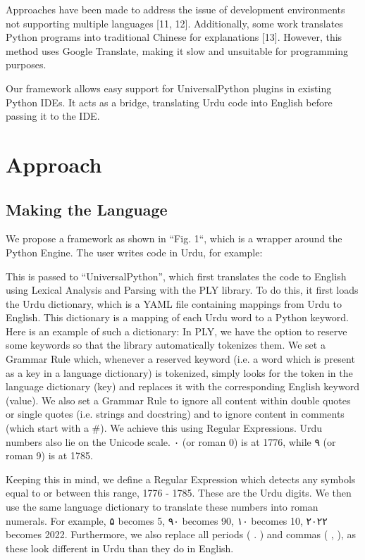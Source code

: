 \documentclass[conference]{IEEEtran}
\begin{document}
Approaches have been made to address the issue of development environments not supporting multiple languages [11, 12]. Additionally, some work translates Python programs into traditional Chinese for explanations [13]. However, this method uses Google Translate, making it slow and unsuitable for programming purposes.

Our framework allows easy support for UniversalPython plugins in existing Python IDEs. It acts as a bridge, translating Urdu code into English before passing it to the IDE.

\section{Approach}

\subsection{Making the Language}

We propose a framework as shown in “Fig. 1“, which is a wrapper around the Python Engine. The user writes code in Urdu, for example:

This is passed to “UniversalPython”, which first translates the code to English using Lexical Analysis and Parsing with the PLY library.
To do this, it first loads the Urdu dictionary, which is a YAML file containing mappings from Urdu to English. This dictionary is a mapping of each Urdu word to a Python keyword. Here is an example of such a dictionary:
In PLY, we have the option to reserve some keywords so that the library automatically tokenizes them. We set a Grammar Rule which, whenever a reserved keyword (i.e. a word which is present as a key in a language dictionary) is tokenized, simply looks for the token in the language dictionary (key) and replaces it with the corresponding English keyword (value).
We also set a Grammar Rule to ignore all content within double quotes or single quotes (i.e. strings and docstring) and to ignore content in comments (which start with a \#). We achieve this using Regular Expressions.
Urdu numbers also lie on the Unicode scale. ۰ (or roman 0) is at 1776, while ۹ (or roman 9) is at 1785.

Keeping this in mind, we define a Regular Expression
which detects any symbols equal to or between this range, 1776 - 1785. These are the Urdu digits. We then use the same language dictionary to translate these numbers into roman numerals. For example, ۵ becomes 5, ۹۰ becomes 90, ۱۰ becomes 10, ۲۰۲۲ becomes 2022.
Furthermore, we also replace all periods ( . ) and commas ( , ), as these look different in Urdu than they do in English.
\end{document}
